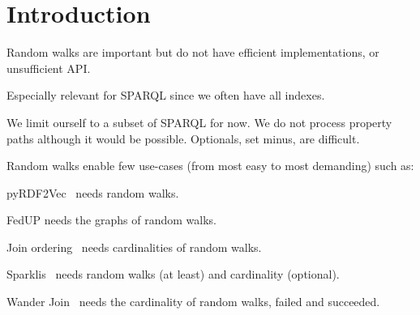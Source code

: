 
\section{Introduction}

Random walks are important but do not have efficient implementations,
or unsufficient API.

Especially relevant for SPARQL since we often have all indexes.

We limit ourself to a subset of SPARQL for now. We do not process
property paths although it would be possible. Optionals, set minus, are
difficult.


Random walks enable few use-cases (from most easy to most demanding)
such as:
\begin{asparadesc}
\item [pyRDF2Vec~\cite{steenwinckel2023pyrdf2vec}] needs random walks.
\item [FedUP] needs the graphs of random walks.
\item [Join ordering~\REF] needs cardinalities of random walks.
\item [Sparklis~\cite{ferre2017sparklis}] needs random walks (at
  least) and cardinality (optional).
\item [Wander Join~\cite{li2016wanderjoin}] needs the cardinality of
  random walks, failed and succeeded.
\end{asparadesc}
